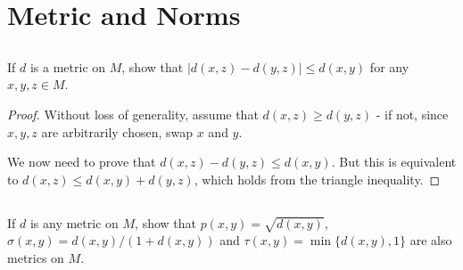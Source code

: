\section{Metric and Norms}


\subsection{} If $d$ is a metric on $M$, show that $|d(x, z)-d(y, z)| \leq d(x,y)$ for any $x,y,z \in M$.

\begin{proof}
Without loss of generality, assume that $d(x,z) \geq d(y,z)$ - if not, since $x,y,z$ are arbitrarily chosen, swap $x$ and $y$. 

We now need to prove that $d(x, z)-d(y, z) \leq d(x,y)$. But this is equivalent to $d(x, z) \leq d(x,y) + d(y, z)$, which holds from the triangle inequality.
\end{proof}


\subsection{} If $d$ is any metric on $M$, show that $p(x, y) = \sqrt{d(x , y)}$, $\sigma(x, y) = d(x , y)/(1+ d(x, y))$ and $\tau(x, y) = \min\{d(x , y), 1\}$ are also metrics on $M$.

